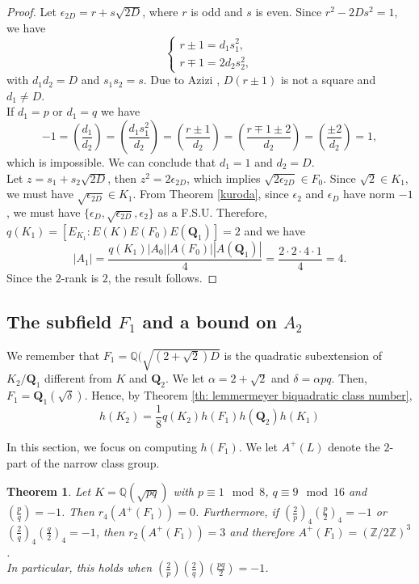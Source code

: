 \documentclass{article}
\numberwithin{equation}{section}
\theoremstyle{plain}  %
\newtheorem{theorem}{Theorem}[section]
\theoremstyle{definition}
\newcommand{\Z}{\mathbb{Z}}
\newcommand{\Q}{\mathbb{Q}}
\newcommand{\kron}[2]{\left( \tfrac{#1}{#2} \right)}
\begin{document}
\begin{proof}
    Let  $\epsilon_{2D} = r + s \sqrt{2D}$, where $r$ is odd and $s$ is even. Since $r^2-2Ds^2=1$, we have 
\begin{equation*}
    \begin{cases}
        r \pm 1 = d_{1} s_{1}^{2}, \\
        r \mp 1 = 2d_{2} s_{2}^{2},
    \end{cases}
\end{equation*}
with $d_{1}d_{2}=D$ and $s_{1}s_{2}=s$. Due to Azizi \cite{MR2296826}, $D(r \pm 1)$ is not a square and $d_1 \neq D$. \\

If $d_1=p$ or $d_1=q$ we have 
$$-1=\left(\frac{d_1}{d_2} \right)=\left(\frac{d_1 s_{1}^2}{d_2} \right)=\left(\frac{r \pm 1}{d_{2}} \right)=\left(\frac{r\mp1\pm2}{d_2} \right)= \left(\frac{\pm2}{d_{2}} \right)=1,$$
 which is impossible. We can conclude that $d_1=1$ and $d_2=D$.\\
 
 Let $z=s_1+s_2 \sqrt{2D}$, then $z^2=2 \epsilon_{2D}$, which implies $\sqrt{2 \epsilon_{2D}} \in F_0$. Since $\sqrt{2} \in K_1$, we must have $\sqrt{\epsilon_{2D}} \in K_1$. From Theorem \ref{kuroda}, since $\epsilon_2$ and $\epsilon_D$ have norm $-1$, we must have $\{ \epsilon_D, \sqrt{\epsilon_{2D}}, \epsilon_2 \}$ as a F.S.U. Therefore, $q(K_1) = [E_{K_1}:E(K)E(F_0)E(\mathbf Q_1)]=2$ and we have 
 $$|A_1|=\frac{q(K_1)|A_0||A(F_0)||A(\mathbf Q_1)|}{4}=\frac{2 \cdot 2 \cdot 4 \cdot 1}{4}=4.$$
 Since the $2$-rank is $2$, the result follows.
\end{proof}

\subsection{The subfield \texorpdfstring{$F_1$}{F1} and a bound on \texorpdfstring{$A_2$}{A2}}
We remember that $F_1 = \Q(\sqrt{(2+\sqrt{2})D}$ is the quadratic subextension of $K_2/\mathbf{Q}_1$ different from $K$ and $\mathbf Q_2$. We let $\alpha = 2+\sqrt{2} $ and $\delta = \alpha pq$. Then, $F_1=\mathbf Q_1(\sqrt{\delta})$. Hence, by Theorem \ref{th: lemmermeyer biquadratic class number}, 
    $$h(K_2)= \frac 18 q(K_2) h(F_1) h(\mathbf Q_2) h(K_1)$$

 In this section, we focus on computing $h(F_1)$. We let $A^{+}(L)$ denote the $2$-part of the narrow class group.



\begin{theorem} \label{th: r_4 of F1}
    Let $K=\Q(\sqrt{pq})$ with $p \equiv 1 \mod 8$, $q\equiv 9 \mod 16$ and $\kron{p}{q}=-1$. Then $r_4(A^+(F_1))=0$. Furthermore, if $\kron{2}{p}_4 \kron{p}{2}_4=-1$ or $\kron{2}{q}_4 \kron{q}{2}_4=-1$, then $r_2(A^+(F_1))=3$ and therefore $A^+(F_1)=(\Z/2\Z)^3$. \\
    
    In particular, this holds when $\kron{2}{p}\kron{2}{q}\kron{pq}{2}=-1$.  
\end{theorem}
\end{document}
